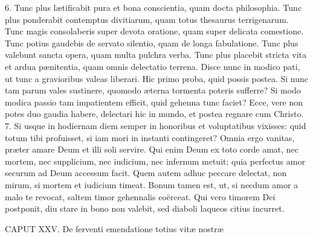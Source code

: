 \documentclass[twoside]{article}
\begin{document}
6. Tunc plus lætificabit pura et bona conscientia, quam docta philosophia. Tunc plus ponderabit contemptus divitiarum, quam totus thesaurus terrigenarum. Tunc magis consolaberis super devota oratione, quam super delicata comestione. Tunc potius gaudebis de servato silentio, quam de longa fabulatione. Tunc plus valebunt sancta opera, quam multa pulchra verba. Tunc plus placebit stricta vita et ardua pænitentia, quam omnis delectatio terrena. Disce nunc in modico pati, ut tunc a gravioribus valeas liberari. Hic primo proba, quid possis postea. Si nunc tam parum vales sustinere, quomodo æterna tormenta poteris sufferre? Si modo modica passio tam impatientem efficit, quid gehenna tunc faciet? Ecce, vere non potes duo gaudia habere, delectari hic in mundo, et postea regnare cum Christo.
7. Si usque in hodiernam diem semper in honoribus et voluptatibus vixisses: quid totum tibi profuisset, si iam mori in instanti contingeret? Omnia ergo vanitas, præter amare Deum et illi soli servire. Qui enim Deum ex toto corde amat, nec mortem, nec supplicium, nec iudicium, nec infernum metuit; quia perfectus amor securum ad Deum accessum facit. Quem autem adhuc peccare delectat, non mirum, si mortem et iudicium timeat. Bonum tamen est, ut, si necdum amor a malo te revocat, saltem timor gehennalis coërceat. Qui vero timorem Dei postponit, diu stare in bono non valebit, sed diaboli laqueos citius incurret.


CAPUT XXV.
De ferventi emendatione totius vitæ nostræ
\end{document}

